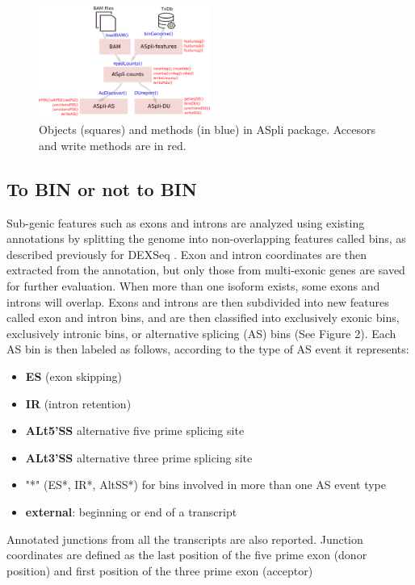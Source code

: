 \documentclass{article}
\begin{document}
\begin{figure}[ht!]
\centering
\includegraphics[width=0.5\textwidth]{wf.png}
\caption{Objects (squares) and methods (in blue) in ASpli package.  Accesors and write methods are in red.}
\end{figure}

\subsection{To BIN or not to BIN} %
Sub-genic features such as exons and introns are analyzed using existing annotations by splitting the genome into non-overlapping features called bins, as described previously for DEXSeq \cite{pmid22722343}. Exon and intron coordinates are then extracted from the annotation, but only those from multi-exonic genes are saved for further evaluation. When more than one isoform exists, some exons and introns will overlap. Exons and introns are then subdivided into new features called exon and intron bins, and are then classified into exclusively exonic bins, exclusively intronic bins, or alternative splicing (AS) bins (See Figure 2). Each AS bin is then labeled as follows, according to the type of AS event it represents: 

\begin{itemize}
\item \textbf {ES} (exon skipping)
\item \textbf {IR} (intron retention)
\item \textbf {ALt5'SS} alternative five prime splicing site
\item \textbf {ALt3'SS} alternative three prime splicing site
\item "*" (ES*, IR*, AltSS*) for bins involved in more than one AS event type
\item \textbf {external}: beginning or end of a transcript
\end{itemize}

Annotated junctions from all the transcripts are also reported. Junction coordinates are defined as the last position of the five prime exon (donor position) and first position of the three prime exon (acceptor)
\end{document}
